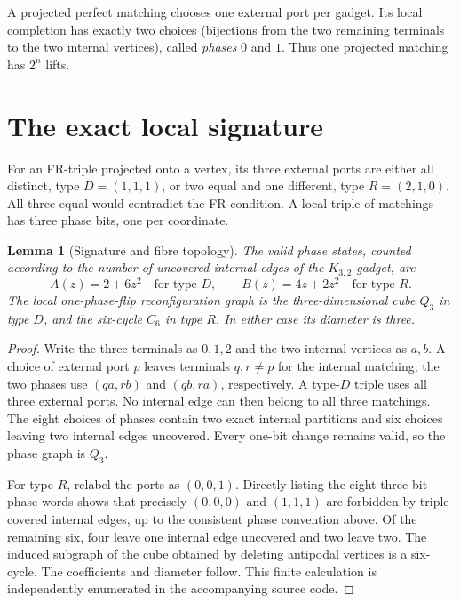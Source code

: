 \documentclass[11pt]{article}
\newtheorem{lemma}{Lemma}
\begin{document}
A projected perfect matching chooses one external port per gadget. Its local completion has exactly two choices (bijections from the two remaining terminals to the two internal vertices), called \emph{phases} $0$ and $1$. Thus one projected matching has $2^n$ lifts.

\section{The exact local signature}
For an FR-triple projected onto a vertex, its three external ports are either all distinct, type $D=(1,1,1)$, or two equal and one different, type $R=(2,1,0)$. All three equal would contradict the FR condition. A local triple of matchings has three phase bits, one per coordinate.

\begin{lemma}[Signature and fibre topology]\label{lem:local}
The valid phase states, counted according to the number of uncovered \emph{internal} edges of the $K_{3,2}$ gadget, are
\[
 A(z)=2+6z^2\quad\text{for type }D,\qquad
 B(z)=4z+2z^2\quad\text{for type }R.
\]
The local one-phase-flip reconfiguration graph is the three-dimensional cube $Q_3$ in type $D$, and the six-cycle $C_6$ in type $R$. In either case its diameter is three.
\end{lemma}
\begin{proof}
Write the three terminals as $0,1,2$ and the two internal vertices as $a,b$. A choice of external port $p$ leaves terminals $q,r\ne p$ for the internal matching; the two phases use $(qa,rb)$ and $(qb,ra)$, respectively. A type-$D$ triple uses all three external ports. No internal edge can then belong to all three matchings. The eight choices of phases contain two exact internal partitions and six choices leaving two internal edges uncovered. Every one-bit change remains valid, so the phase graph is $Q_3$.

For type $R$, relabel the ports as $(0,0,1)$. Directly listing the eight three-bit phase words shows that precisely $(0,0,0)$ and $(1,1,1)$ are forbidden by triple-covered internal edges, up to the consistent phase convention above. Of the remaining six, four leave one internal edge uncovered and two leave two. The induced subgraph of the cube obtained by deleting antipodal vertices is a six-cycle. The coefficients and diameter follow. This finite calculation is independently enumerated in the accompanying source code.
\end{proof}
\end{document}
